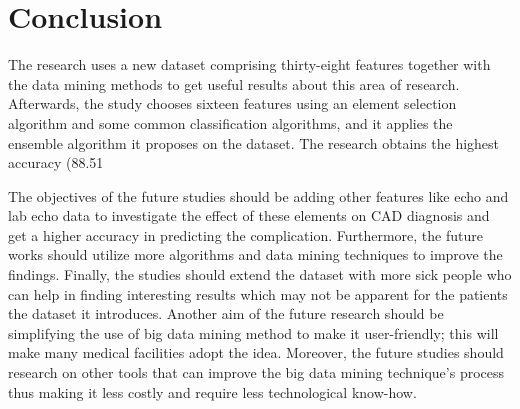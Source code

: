 \documentclass[sigconf]{acmart}
\begin{document}
\section{Conclusion}
The research uses a new dataset comprising thirty-eight features together with the data mining methods to get useful results about this area of research. Afterwards, the study chooses sixteen features using an element selection algorithm and some common classification algorithms, and it applies the ensemble algorithm it proposes on the dataset. The research obtains the highest accuracy (88.51%
\par The objectives of the future studies should be adding other features like echo and lab echo data to investigate the effect of these elements on CAD diagnosis and get a higher accuracy in predicting the complication. Furthermore, the future works should utilize more algorithms and data mining techniques to improve the findings. Finally, the studies should extend the dataset with more sick people who can help in finding interesting results which may not be apparent for the patients the dataset it introduces. Another aim of the future research should be simplifying the use of big data mining method to make it user-friendly; this will make many medical facilities adopt the idea. Moreover, the future studies should research on other tools that can improve the big data mining technique's process thus making it less costly and require less technological know-how.
\end{document}
